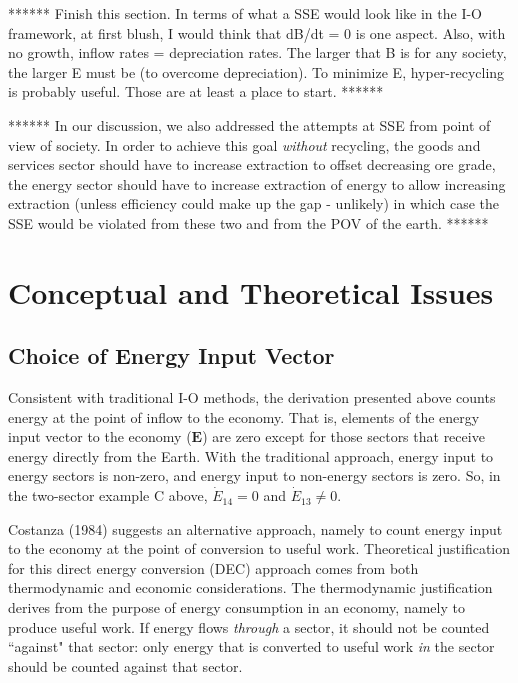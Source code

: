 \documentclass[authoryear,preprint,review,12pt]{elsarticle}
\renewcommand{\vec}[1]{\mathbf{#1}}
\begin{document}
****** Finish this section. In terms of what a SSE would look like in the I-O framework, at first blush, I would think that dB/dt = 0 is one aspect.  Also, with no growth, inflow rates = depreciation rates.  The larger that B is for any society, the larger E must be (to overcome depreciation).  To minimize E, hyper-recycling is probably useful.  Those are at least a place to start. ******

****** In our discussion, we also addressed the attempts at SSE from point of view of society. In order to achieve this goal \emph{without} recycling, the goods and services sector should have to increase extraction to offset decreasing ore grade, the energy sector should have to increase extraction of energy to allow increasing extraction (unless efficiency could make up the gap - unlikely) in which case the SSE would be violated from these two and from the POV of the earth.
******


\section{Conceptual and Theoretical Issues}


\subsection{Choice of Energy Input Vector}

Consistent with traditional I-O methods, the derivation presented above counts energy at the point of inflow to the economy. That is, elements of the energy input vector to the economy ($\vec{E}$) are zero except for those sectors that receive energy directly from the Earth. With the traditional approach, energy input to energy sectors is non-zero, and energy input to non-energy sectors is zero. So, in the two-sector example C above, $\dot{E}_{14} = 0$ and $\dot{E}_{13} \neq 0$. 

Costanza (1984) suggests an alternative approach, namely to count energy input to the economy at the point of conversion to useful work. Theoretical justification for this direct energy conversion (DEC) approach comes from both thermodynamic and economic considerations. The thermodynamic justification derives from the purpose of energy consumption in an economy, namely to produce useful work. If energy flows \emph{through} a sector, it should not be counted ``against" that sector: only energy that is converted to useful work \emph{in} the sector should be counted against that sector.
\end{document}
